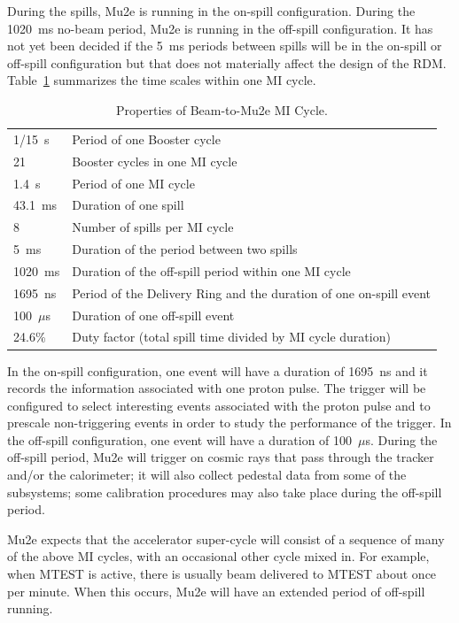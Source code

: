 During the spills, Mu2e is running in the on-spill configuration.
During the 1020~ms no-beam period, Mu2e is running in the off-spill configuration.
It has not yet been decided if the 5~ms periods between spills will
be in the on-spill or off-spill configuration
but that does not materially affect the design of the RDM.
Table~\ref{tab:timescales} summarizes the time scales within one MI cycle.
\begin{table}
\begin{center}
\caption[Properties of the Beam-to-Mu2e MI Cycle]{Properties of Beam-to-Mu2e MI Cycle.}
\label{tab:timescales}
\begin{tabular}{ll}\hline
   1/15~s & Period of one Booster cycle \\
   21     & Booster cycles in one MI cycle \\
   1.4~s  & Period of one MI cycle \\
   43.1~ms & Duration of one spill \\
   8       & Number of spills per MI cycle \\
    5~ms   & Duration of the period between two spills \\
   1020~ms & Duration of the off-spill period within one MI cycle \\
   1695~ns & Period of the Delivery Ring and the duration of one on-spill event\\
   100~$\mu$s & Duration of one off-spill event \\
   24.6\%     & Duty factor (total spill time divided by MI cycle duration)\\
   \hline
  \end{tabular}
\end{center}
\end{table}


In the on-spill configuration, one event will have  a duration of 1695~ns
and it records the information associated with one proton pulse.
The trigger will be configured to select interesting events associated with the proton pulse
and to prescale non-triggering events in order to study the performance of the trigger.
In the off-spill configuration, one event will have a duration of 100~$\mu$s.
During the off-spill period, Mu2e will trigger on cosmic rays that
pass through the tracker and/or the calorimeter; it will also collect
pedestal data from some of the subsystems; some calibration procedures
may also take place during the off-spill period.

Mu2e expects that the accelerator super-cycle will consist of a
sequence of many of the above MI cycles,
with an occasional other cycle mixed in.
For example, when MTEST is active, there is usually beam delivered to MTEST about once per minute.
When this occurs, Mu2e will have an extended period of off-spill running.

